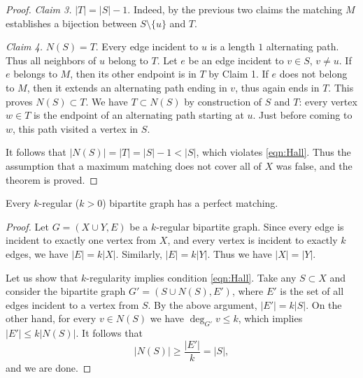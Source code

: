 \begin{page}
\begin{proof}
\emph{Claim 3.} $|T| = |S| - 1$.
Indeed, by the previous two claims the matching $M$ establishes a bijection between $S \setminus \{u\}$ and $T$.

\emph{Claim 4.} $N(S) = T$.
Every edge incident to $u$ is a length $1$ alternating path.
Thus all neighbors of $u$ belong to $T$.
Let $e$ be an edge incident to $v \in S$, $v \ne u$.
If $e$ belongs to $M$, then its other endpoint is in $T$ by Claim 1.
If $e$ does not belong to $M$, then it extends an alternating path ending in $v$, thus again ends in $T$.
This proves $N(S) \subset T$.
We have $T \subset N(S)$ by construction of $S$ and $T$: every vertex $w \in T$ is the endpoint of an alternating path starting at $u$.
Just before coming to $w$, this path visited a vertex in $S$.

It follows that $|N(S)| = |T| = |S| - 1 < |S|$, which violates \eqref{eqn:Hall}.
Thus the assumption that a maximum matching does not cover all of $X$ was false, and the theorem is proved.
\end{proof}



\end{page}

\begin{page}

\begin{cor}
Every $k$-regular ($k>0$) bipartite graph has a perfect matching.
\end{cor}

\end{page}

\begin{page}

\begin{proof}
Let $G = (X \cup Y, E)$ be a $k$-regular bipartite graph.
Since every edge is incident to exactly one vertex from $X$, and every vertex is incident to exactly $k$ edges, we have $|E| = k|X|$.
Similarly, $|E| = k|Y|$. Thus we have $|X| = |Y|$.

Let us show that $k$-regularity implies condition \eqref{eqn:Hall}.
Take any $S \subset X$ and consider the bipartite graph $G' = (S \cup N(S), E')$, where $E'$ is the set of all edges incident to a vertex from $S$.
By the above argument, $|E'| = k|S|$.
On the other hand, for every $v \in N(S)$ we have $\deg_{G'} v \le k$, which implies $|E'| \le k|N(S)|$.
It follows that
\[
|N(S)| \ge \frac{|E'|}{k} = |S|,
\]
and we are done.
\end{proof}








\end{page}

